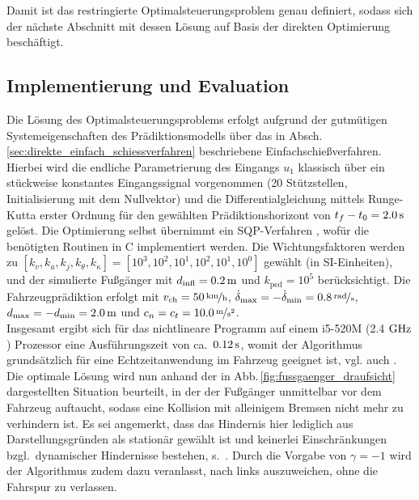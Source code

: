 Damit ist das restringierte Optimalsteuerungsproblem genau definiert, sodass sich der nächste Abschnitt mit dessen Lösung auf Basis der direkten Optimierung beschäftigt. 

\subsection{Implementierung und Evaluation} \label{sec:implementation}
\label{sec:results} %
Die Lösung des Optimalsteuerungsproblems erfolgt aufgrund der gutmütigen Systemeigenschaften des Prädiktionsmodells über das in Absch.\,\ref{sec:direkte_einfach_schiessverfahren} beschriebene Einfachschießverfahren. Hierbei wird die endliche Parametrierung des Eingangs $u_1$ klassisch über ein stückweise konstantes Eingangssignal vorgenommen (20 Stützstellen, Initialisierung mit dem Nullvektor) und die Differentialgleichung mittels Runge-Kutta erster Ordnung für den gewählten Prädiktionshorizont von $t_f - t_0 = \unit[2.0]{s}$ gelöst. Die Optimierung selbst übernimmt ein SQP-Verfahren \cite{papageorgiou2012optimierung}, wofür die benötigten Routinen in C implementiert werden.  %
Die Wichtungsfaktoren werden zu $[k_v, k_a, k_j, k_\theta, k_\kappa]=[10^3, 10^2, 10^1, 10^2, 10^1, 10^0]$ gewählt (in SI-Einheiten), und der simulierte Fußgänger mit $d_{\text{infl}}=\unit[0.2]{m}$ und $k_\text{ped} = 10^5$ berücksichtigt. Die Fahrzeugprädiktion erfolgt mit $v_\text{ch}=\unitfrac[50]{km}{h}$, $\dot \delta_{\max} = - \dot \delta_{\min} = \unitfrac[0.8]{rad}{s}$,  $d_{\max} = -d_{\min} = \unit[2.0]{m}$ und $c_n=c_t=\unitfrac[10.0]{m}{s^2}$. \\
Insgesamt ergibt sich für das nichtlineare Programm auf einem i5-520M (2.4 $\unit[]{GHz}$) Prozessor eine Ausführungszeit von ca.\ $\unit[0.12]{s}$,   womit der Algorithmus grundsätzlich für eine Echtzeitanwendung im Fahrzeug geeignet ist, vgl. auch \cite{alamir2010use}. \\
%
Die optimale Lösung wird nun anhand der in Abb.\,\ref{fig:fussgaenger_draufsicht} dargestellten Situation beurteilt, in der der Fußgänger unmittelbar vor dem Fahrzeug auftaucht, sodass eine Kollision mit alleinigem Bremsen nicht mehr zu verhindern ist. Es sei angemerkt, dass das Hindernis hier lediglich aus Darstellungsgründen als stationär gewählt ist und keinerlei Einschränkungen bzgl.\ dynamischer Hindernisse bestehen, s.\ . Durch die Vorgabe von $\gamma = -1$ wird der Algorithmus zudem dazu veranlasst, nach links auszuweichen, ohne die Fahrspur zu verlassen. \\
